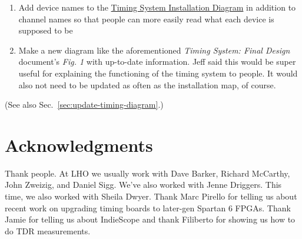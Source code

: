 \documentclass{article}
\newcommand*{\TODO}{\textcolor{todo}}
\begin{document}
\begin{enumerate}
    \item{\TODO{Add device names} to the \href{https://dcc.ligo.org/LIGO-D1500201}{Timing System Installation Diagram} in addition to channel names so that people can more easily read what each device is supposed to be}
    \item{\TODO{Make a new diagram like the aforementioned \textit{Timing System: Final Design} document's \textit{Fig. 1} with up-to-date information}. Jeff said this would be super useful for explaining the functioning of the timing system to people. It would also not need to be updated as often as the installation map, of course.}
\end{enumerate}

(See also Sec.~\ref{sec:update-timing-diagram}.)

\section{Acknowledgments}

\TODO{Thank people. At LHO we usually work with Dave Barker, Richard McCarthy, John Zweizig, and Daniel Sigg. We've also worked with Jenne Driggers. This time, we also worked with Sheila Dwyer. Thank Marc Pirello for telling us about recent work on upgrading timing boards to later-gen Spartan 6 FPGAs. Thank Jamie for telling us about IndieScope and thank Filiberto for showing us how to do TDR measurements. } 


\clearpage
\appendix
\end{document}
